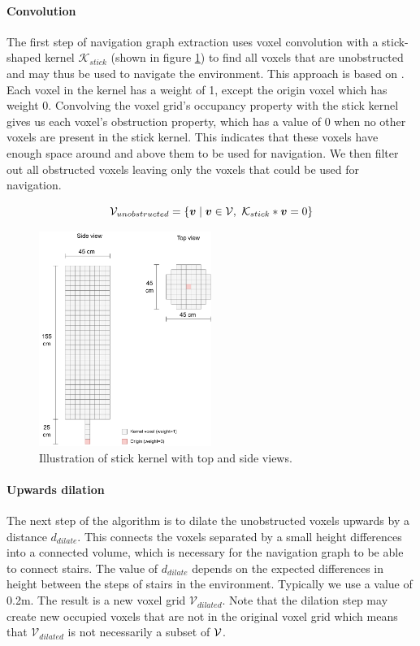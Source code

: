 \paragraph{Convolution}
The first step of navigation graph extraction uses voxel convolution with a stick-shaped kernel \(\mathcal{K}_{stick}\) (shown in figure \ref{fig:stick_kernel}) to find all voxels that are unobstructed and may thus be used to navigate the environment. This approach is based on \citet{gorte_navigation_2019}. Each voxel in the kernel has a weight of 1, except the origin voxel which has weight 0. Convolving the voxel grid's occupancy property with the stick kernel gives us each voxel's obstruction property, which has a value of 0 when no other voxels are present in the stick kernel. This indicates that these voxels have enough space around and above them to be used for navigation. We then filter out all obstructed voxels leaving only the voxels that could be used for navigation.

\begin{equation}
    \label{eq:convolve}
\mathcal{V}_{unobstructed}=\{\boldsymbol{v} \mid \boldsymbol{v} \in \mathcal{V},\ \mathcal{K}_{stick} * \boldsymbol{v} = 0\}
\end{equation}

\begin{figure}[h]
    \centering
    \includegraphics*[width=0.5\textwidth]{./fig/structuring_element.drawio.pdf}
    \caption{Illustration of stick kernel with top and side views.}
    \label{fig:stick_kernel}
\end{figure}

\paragraph{Upwards dilation}
The next step of the algorithm is to dilate the unobstructed voxels upwards by a distance \(d_{dilate}\). This connects the voxels separated by a small height differences into a connected volume, which is necessary for the navigation graph to be able to connect stairs. The value of \(d_{dilate}\) depends on the expected differences in height between the steps of stairs in the environment. Typically we use a value of 0.2m. The result is a new voxel grid \(\mathcal{V}_{dilated}\). Note that the dilation step may create new occupied voxels that are not in the original voxel grid which means that \(\mathcal{V}_{dilated}\) is not necessarily a subset of \(\mathcal{V}\).

